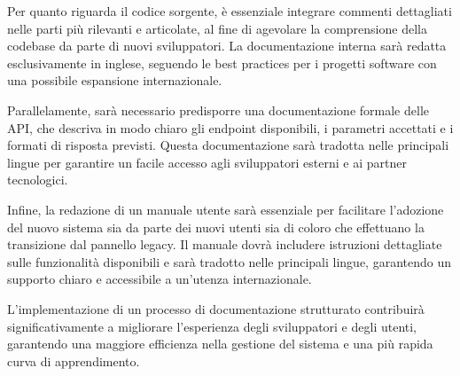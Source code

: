 Per quanto riguarda il codice sorgente, è essenziale integrare commenti dettagliati nelle parti più rilevanti e articolate, al fine di agevolare la comprensione della codebase da parte di nuovi sviluppatori. La documentazione interna sarà redatta esclusivamente in inglese, seguendo le best practices per i progetti software con una possibile espansione internazionale.

Parallelamente, sarà necessario predisporre una documentazione formale delle API, che descriva in modo chiaro gli endpoint disponibili, i parametri accettati e i formati di risposta previsti. Questa documentazione sarà tradotta nelle principali lingue per garantire un facile accesso agli sviluppatori esterni e ai partner tecnologici.

Infine, la redazione di un manuale utente sarà essenziale per facilitare l’adozione del nuovo sistema sia da parte dei nuovi utenti sia di coloro che effettuano la transizione dal pannello legacy. Il manuale dovrà includere istruzioni dettagliate sulle funzionalità disponibili e sarà tradotto nelle principali lingue, garantendo un supporto chiaro e accessibile a un’utenza internazionale.

L’implementazione di un processo di documentazione strutturato contribuirà significativamente a migliorare l’esperienza degli sviluppatori e degli utenti, garantendo una maggiore efficienza nella gestione del sistema e una più rapida curva di apprendimento.
